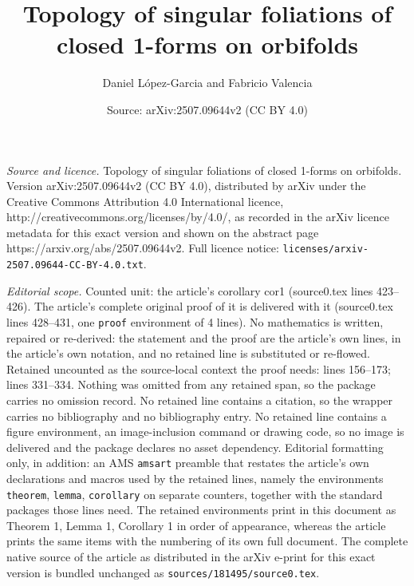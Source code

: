 \documentclass[10pt,a4paper]{amsart}
\title{Topology of singular foliations of closed 1-forms on orbifolds}
\author{Daniel L\'opez-Garcia {\tiny and} Fabricio Valencia}
\date{Source: arXiv:2507.09644v2 (CC BY 4.0)}
\begin{document}
\maketitle

\noindent\emph{Source and licence.} Topology of singular foliations of closed 1-forms on orbifolds. Version arXiv:2507.09644v2 (CC BY 4.0), distributed by arXiv under the Creative Commons Attribution 4.0 International licence, http://creativecommons.org/licenses/by/4.0/, as recorded in the arXiv licence metadata for this exact version and shown on the abstract page https://arxiv.org/abs/2507.09644v2. Full licence notice: \texttt{licenses/arxiv-2507.09644-CC-BY-4.0.txt}.\par\smallskip

\noindent\textit{Editorial scope.} Counted unit: the article's corollary cor1 (source0.tex lines 423--426). The article's complete original proof of it is delivered with it (source0.tex lines 428--431, one \texttt{proof} environment of 4 lines). No mathematics is written, repaired or re-derived: the statement and the proof are the article's own lines, in the article's own notation, and no retained line is substituted or re-flowed.  Retained uncounted as the source-local context the proof needs: lines 156--173; lines 331--334.  Nothing was omitted from any retained span, so the package carries no omission record.  No retained line contains a citation, so the wrapper carries no bibliography and no bibliography entry.  No retained line contains a figure environment, an image-inclusion command or drawing code, so no image is delivered and the package declares no asset dependency.  Editorial formatting only, in addition: an AMS \texttt{amsart} preamble that restates the article's own declarations and macros used by the retained lines, namely the environments \texttt{theorem}, \texttt{lemma}, \texttt{corollary} on separate counters, together with the standard packages those lines need.  The retained environments print in this document as Theorem 1, Lemma 1, Corollary 1 in order of appearance, whereas the article prints the same items with the numbering of its own full document.  The complete native source of the article as distributed in the arXiv e-print for this exact version is bundled unchanged as \texttt{sources/181495/source0.tex}.
\end{document}
